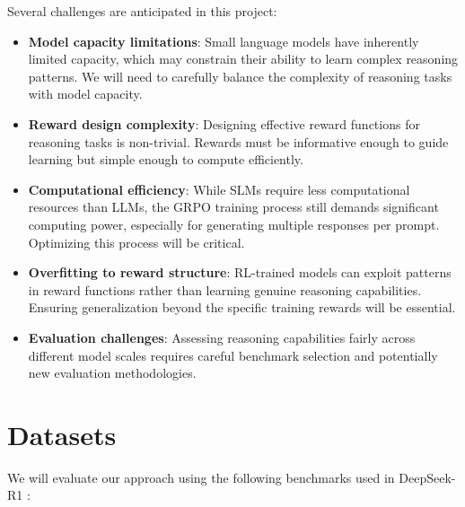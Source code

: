 \documentclass[11pt, oneside]{article}   	%
\begin{document}
Several challenges are anticipated in this project:

\begin{itemize}
	\item \textbf{Model capacity limitations}: Small language models have inherently limited capacity, which may constrain their ability to learn complex reasoning patterns. We will need to carefully balance the complexity of reasoning tasks with model capacity.

	\item \textbf{Reward design complexity}: Designing effective reward functions for reasoning tasks is non-trivial. Rewards must be informative enough to guide learning but simple enough to compute efficiently.

	\item \textbf{Computational efficiency}: While SLMs require less computational resources than LLMs, the GRPO training process still demands significant computing power, especially for generating multiple responses per prompt. Optimizing this process will be critical.

	\item \textbf{Overfitting to reward structure}: RL-trained models can exploit patterns in reward functions rather than learning genuine reasoning capabilities. Ensuring generalization beyond the specific training rewards will be essential.

	\item \textbf{Evaluation challenges}: Assessing reasoning capabilities fairly across different model scales requires careful benchmark selection and potentially new evaluation methodologies.
\end{itemize}

\section*{Datasets}


We will evaluate our approach using the following benchmarks used in DeepSeek-R1 \cite{deepseekai2025deepseekr1incentivizingreasoningcapability}:
\end{document}
